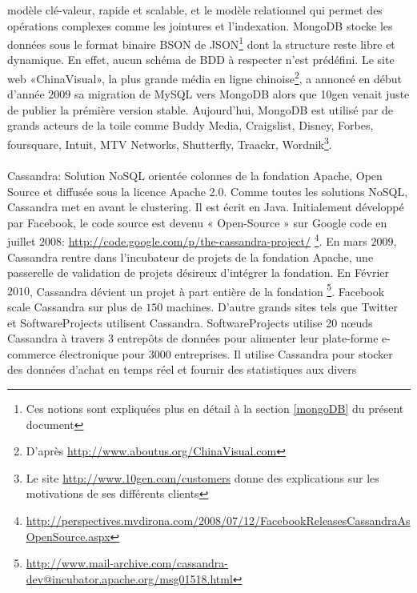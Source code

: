 modèle \textsf{clé-valeur}, rapide et scalable, et le modèle
relationnel qui permet des opérations complexes comme les jointures et
l'indexation. \textsf{MongoDB} stocke les données sous le format
binaire \textsf{BSON} de \textsf{JSON}\footnote{Ces notions sont
expliquées plus en détail à la section \ref{mongoDB} du présent
document} dont la structure reste libre et dynamique.  En effet, aucun
schéma de \textsf{BDD} à respecter n'est prédéfini\cite{mongoDB}. Le
site web «\textsf{ChinaVisual}», la plus grande média en ligne
chinoise\footnote{D'après \url{http://www.aboutus.org/ChinaVisual.com}},
a annoncé en début d'année $2009$ sa migration de \textsf{MySQL}
vers \textsf{MongoDB}\cite{GUYunhua} alors que \textsf{10gen} venait juste de publier la prémière version stable. Aujourd'hui, \textsf{MongoDB} est utilisé par de grands acteurs de la toile comme \textsf{Buddy Media, Craigslist, Disney, Forbes, foursquare, Intuit, MTV Networks, Shutterfly, Traackr, Wordnik}\footnote{Le site \url{http://www.10gen.com/customers} donne des explications sur les motivations de ses différents clients}.
\\
\\ 
\textsf{Cassandra}:  Solution \textsf{NoSQL} orientée 
\textsf{colonnes} de la fondation \textsf{Apache}, Open Source et diffusée sous la licence
 Apache 2.0. Comme toutes les solutions \textsf{NoSQL}, \textsf{Cassandra} 
met en avant le clustering. Il est écrit en 
\textsf{Java}\cite{RickCattell}. Initialement développé par 
\textsf{Facebook}, le code source est devenu « \textsf{Open-Source} » sur 
\textsf{Google code} en juillet $2008$: 
\url{http://code.google.com/p/the-cassandra-project/}
\footnote{\url{http://perspectives.mvdirona.com/2008/07/12/FacebookReleasesCassandraAsOpenSource.aspx}}. En
mars $2009$, \textsf{Cassandra} rentre dans l'incubateur de projets
de la fondation \textsf{Apache}, une passerelle de
validation de projets désireux d'intégrer la fondation. En Février
$2010$, \textsf{Cassandra} dévient un projet à part entière de la
fondation
\footnote{\url{http://www.mail-archive.com/cassandra-dev@incubator.apache.org/msg01518.html}}. \textsf{Facebook}
scale \textsf{Cassandra} sur plus de $150$ machines. D'autre grands
sites tels que \textsf{Twitter et SoftwareProjects}
utilisent \textsf{Cassandra}. \textsf{SoftwareProjects} utilise 20
nœuds \textsf{Cassandra} à travers 3 entrepôts de données pour
alimenter leur plate-forme e-commerce électronique pour $3000$
entreprises. Il utilise \textsf{Cassandra} pour stocker des données
d'achat en temps réel et fournir des statistiques aux divers
